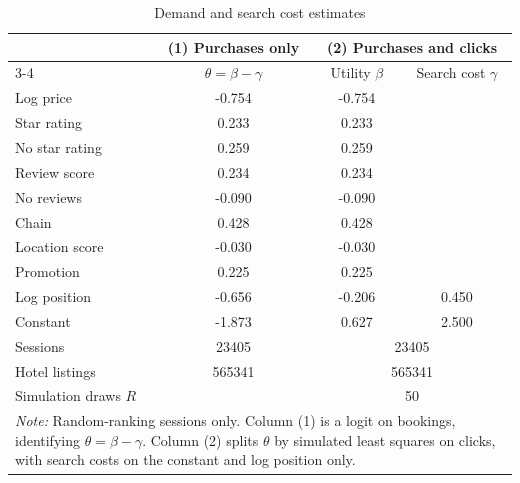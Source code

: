 \begin{table}[htbp]
\centering
\caption{Demand and search cost estimates}
\label{tab:search_estimates}
\begin{tabular}{lccc}
\toprule
 & (1) Purchases only & \multicolumn{2}{c}{(2) Purchases and clicks} \\
\cmidrule(lr){3-4}
 & $\theta = \beta - \gamma$ & Utility $\beta$ & Search cost $\gamma$ \\
\midrule
Log price & -0.754 & -0.754 & \\
Star rating & 0.233 & 0.233 & \\
No star rating & 0.259 & 0.259 & \\
Review score & 0.234 & 0.234 & \\
No reviews & -0.090 & -0.090 & \\
Chain & 0.428 & 0.428 & \\
Location score & -0.030 & -0.030 & \\
Promotion & 0.225 & 0.225 & \\
\midrule
Log position & -0.656 & -0.206 & 0.450 \\
Constant & -1.873 & 0.627 & 2.500 \\
\midrule
Sessions & 23405 & \multicolumn{2}{c}{23405} \\
Hotel listings & 565341 & \multicolumn{2}{c}{565341} \\
Simulation draws $R$ & & \multicolumn{2}{c}{50} \\
\bottomrule
\multicolumn{4}{p{0.9\linewidth}}{\footnotesize \textit{Note:} Random-ranking sessions only. Column (1) is a logit on bookings, identifying $\theta = \beta - \gamma$. Column (2) splits $\theta$ by simulated least squares on clicks, with search costs on the constant and log position only.} \\
\end{tabular}
\end{table}
